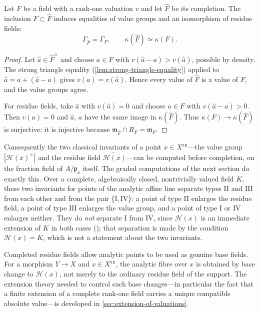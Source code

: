 \begin{lemma}\label{lem:completion-invariants}
Let $F$ be a field with a rank-one valuation $v$ and let $\widehat F$ be
its completion. The inclusion $F\subset\widehat F$ induces equalities of
value groups and an isomorphism of residue fields:
\[
 \Gamma_{\widehat F}=\Gamma_F,
 \qquad
 \kappa(\widehat F)\simeq\kappa(F).
\]
\end{lemma}
\begin{proof}
Let $\widehat a\in\widehat F^\times$ and choose $a\in F$ with
$v(\widehat a-a)>v(\widehat a)$, possible by density. The strong triangle
equality (\cref{lem:strong-triangle-equality}) applied to
$\widehat a=a+(\widehat a-a)$ gives $v(a)=v(\widehat a)$. Hence every value
of $\widehat F$ is a value of $F$, and the value groups agree.

For residue fields, take $\widehat a$ with $v(\widehat a)=0$ and choose
$a\in F$ with $v(\widehat a-a)>0$. Then $v(a)=0$ and $\widehat a$, $a$ have
the same image in $\kappa(\widehat F)$. Thus
$\kappa(F)\to\kappa(\widehat F)$ is surjective; it is injective because
$\mathfrak m_{\widehat F}\cap R_F=\mathfrak m_F$.
\end{proof}

Consequently the two classical invariants of a point
$x\in X^{\mathrm{an}}$---the value group $|\mathcal H(x)^\times|$ and the
residue field $\widetilde{\mathcal H(x)}$---can be computed before
completion, on the fraction field of $A/\mathfrak p_x$ itself. The graded
computations of the next section do exactly this. Over a complete,
algebraically closed, nontrivially valued field $K$, these two invariants
for points of the analytic affine line separate types II and III from
each other and from the pair \{I,\,IV\}: a point of type II enlarges the residue field,
a point of type III enlarges the value group, and a point of type I or IV
enlarges neither.  They do \emph{not} separate I from IV, since
$\mathcal H(x)$ is an immediate extension of $K$ in both cases
(); that separation is made by the
condition $\mathcal H(x)=K$, which is not a statement about the two
invariants.

Completed residue fields allow analytic points to be used as genuine base
fields. For a morphism $Y\to X$ and $x\in X^{\mathrm{an}}$, the analytic
fibre over $x$ is obtained by base change to $\mathcal H(x)$, not merely to
the ordinary residue field of the support. The extension theory needed to
control such base changes---in particular the fact that a finite extension
of a complete rank-one field carries a unique compatible absolute
value---is developed in \cref{sec:extension-of-valuations}.

